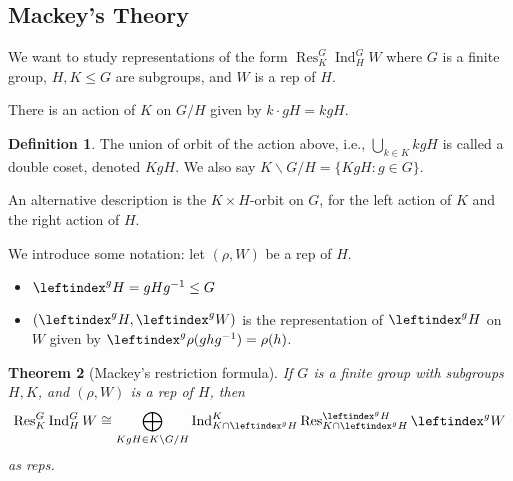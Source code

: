 \documentclass{article}
\theoremstyle{definition}
\newtheorem{defn}{Definition}[section]
\theoremstyle{remark}
\theoremstyle{plain}
\newtheorem{thm}[defn]{Theorem}
\newcommand{\Ind}{\operatorname{Ind}}
\newcommand{\Res}{\operatorname{Res}}
\begin{document}
\subsection{Mackey's Theory}
We want to study representations of the form $\Res^G_K\Ind_H^GW$ where $G$ is a finite group, $H,K\le G$ are subgroups, and $W$ is a rep of $H$.

There is an action of $K$ on $G/H$ given by $k\cdot gH=kgH$.
\begin{defn}
    The union of orbit of the action above, i.e., $\bigcup_{k\in K}kgH$ is called a double coset, denoted $KgH$. We also say $K\backslash G/H=\{KgH:g\in G\}$.
\end{defn}
An alternative description is the $K\times H$-orbit on $G$, for the left action of $K$ and the right action of $H$.

We introduce some notation: let $(\rho, W)$ be a rep of $H$.
\begin{itemize}
    \item $\leftindex^g{H}=gHg^{-1}\le G$
    \item $(\leftindex^gH,\leftindex^gW)$ is the representation of $\leftindex^gH$ on $W$ given by $\leftindex^g\rho(ghg^{-1})=\rho(h)$.
\end{itemize}
\begin{thm}[Mackey's restriction formula]
    If $G$ is a finite group with subgroups $H,K$, and $(\rho, W)$ is a rep of $H$, then
    \[\Res^G_K\Ind_H^G W\cong \bigoplus_{KgH\in K\backslash G/H}\Ind^K_{K\cap\leftindex^gH}\Res^{\leftindex^gH}_{K\cap\leftindex^gH}\leftindex^gW\]
    as reps.
\end{thm}
\end{document}
